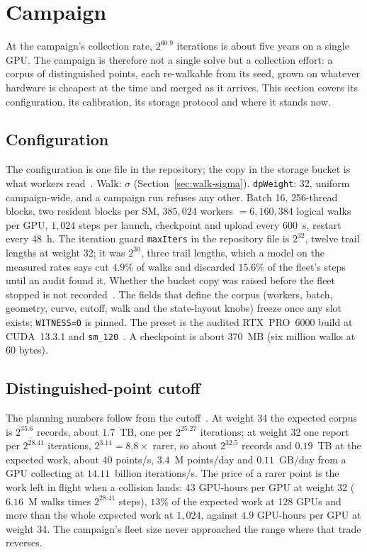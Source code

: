\section{Campaign}
\label{sec:campaign}

At the campaign's collection rate, $2^{60.9}$ iterations is about
five years on a single GPU. The campaign is therefore not a single
solve but a collection effort: a corpus of distinguished points, each
re-walkable from its seed, grown on whatever hardware is cheapest at
the time and merged as it arrives. This section covers its
configuration, its calibration, its storage protocol and where it
stands now.

\subsection{Configuration}

The configuration is one file in the repository; the copy in the
storage bucket is what workers read~. Walk: $\sigma$ (Section~\ref{sec:walk-sigma}). \texttt{dpWeight}: 32,
uniform campaign-wide, and a campaign run refuses any other. Batch 16,
256-thread blocks, two resident blocks per SM, $385{,}024$ workers
$=6{,}160{,}384$ logical walks per GPU, $1{,}024$ steps per launch,
checkpoint and upload every 600~s, restart every 48~h. The iteration guard \texttt{maxIters} in the repository file is
$2^{32}$, twelve trail lengths at weight 32; it was $2^{30}$, three
trail lengths, which a model on the measured rates says cut $4.9\%$ of
walks and discarded $15.6\%$ of the fleet's steps until an audit found
it. Whether the bucket copy was raised before the fleet stopped is not
recorded~. The fields
that define the corpus (workers, batch, geometry, curve, cutoff, walk
and the state-layout knobs) freeze once any slot exists;
\texttt{WITNESS=0} is pinned. The preset is the audited RTX~PRO~6000 build at CUDA~13.3.1 and
\texttt{sm\_120}~. A checkpoint is about
370~MB (six million walks at 60 bytes).

\subsection{Distinguished-point cutoff}
\label{sec:campaign-interval}

The planning numbers follow from the cutoff~.
At weight 34 the expected corpus is $2^{35.6}$ records, about $1.7$~TB,
one per $2^{25.27}$ iterations; at weight 32 one report per $2^{28.41}$
iterations, $2^{3.14}=8.8\times$ rarer, so about $2^{32.5}$ records and
$0.19$~TB at the expected work, about 40 points/s, $3.4$~M points/day
and $0.11$~GB/day from a GPU collecting at $14.11$~billion iterations/s. The price of a
rarer point is the work left in flight when a collision lands: $43$
GPU-hours per GPU at weight 32 ($6.16$~M walks times $2^{28.41}$
steps), $13\%$ of the expected work at 128 GPUs and more than the
whole expected work at $1{,}024$, against $4.9$ GPU-hours per GPU at
weight 34. The campaign's fleet size never approached the range where
that trade reverses.

